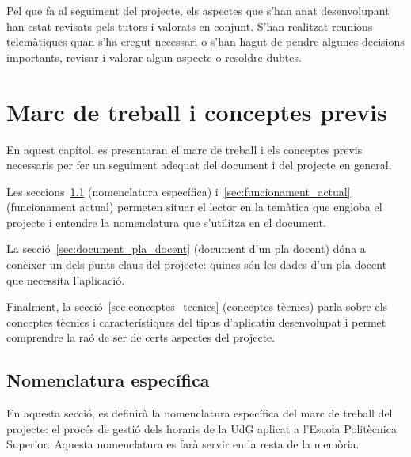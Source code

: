 \documentclass[a4paper,12pt]{ThesisStyle}
\begin{document}
Pel que fa al seguiment del projecte, els aspectes que s'han anat desenvolupant han estat revisats pels tutors i valorats en conjunt. S'han realitzat reunions telemàtiques quan s'ha cregut necessari o s'han hagut de pendre algunes decisions importants, revisar i valorar algun aspecte o resoldre dubtes.


\chapter{Marc de treball i conceptes previs}
\label{cap:marcdetreball}

En aquest capítol, es presentaran el marc de treball i els conceptes previs necessaris per fer un seguiment adequat del document i del projecte en general.

Les seccions~\ref{sec:nomenclatura} (nomenclatura específica) i~\ref{sec:funcionament_actual} (funcionament actual) permeten situar el lector en la temàtica que engloba el projecte i entendre la nomenclatura que s'utilitza en el document.

La secció~\ref{sec:document_pla_docent} (document d'un pla docent) dóna a conèixer un dels punts claus del projecte: quines són les dades d'un pla docent que necessita l'aplicació.

Finalment, la secció~\ref{sec:conceptes_tecnics} (conceptes tècnics) parla sobre els conceptes tècnics i característiques del tipus d'aplicatiu desenvolupat i permet comprendre la raó de ser de certs aspectes del projecte.

\section{Nomenclatura específica}
\label{sec:nomenclatura}

En aquesta secció, es definirà la nomenclatura específica del marc de treball del projecte: el procés de gestió dels horaris de la UdG aplicat a l'Escola Politècnica Superior. Aquesta nomenclatura es farà servir en la resta de la memòria.
\end{document}

